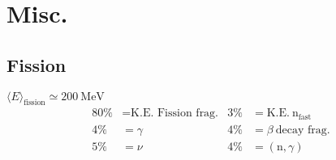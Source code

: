\section{Misc.}
\subsection{Fission}
${\langle E \rangle}_{\text{fission}} \simeq \SI{200}{\mega\electronvolt}$
\begin{align*}
80\% &= \text{K.E. Fission frag.} & 3\% &= \text{K.E.} \ \text{n}_{\text{fast}} \\
4\% &= \gamma & 4\% &= \beta \ \text{decay frag.} \\
5\% &= \nu & 4\% &= (\text{n},\gamma)
\end{align*}